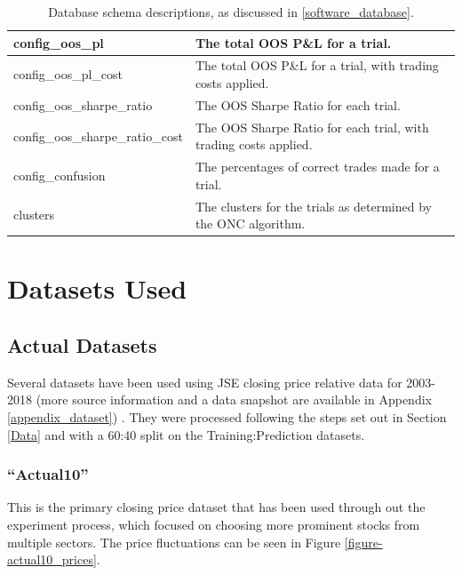 \documentclass[a4paper,11pt,oneside]{article}
\theoremstyle{plain}
\theoremstyle{definition}
\begin{document}
\begin{table}[H]
\begin{tabular}{|p{0.33\linewidth}|p{0.67\linewidth}|}
			{config\_oos\_pl} & {The total OOS P\&L for a trial.}  \\\hline
			{config\_oos\_pl\_cost} & {The total OOS P\&L for a trial, with trading costs applied.}  \\\hline
			{config\_oos\_sharpe\_ratio} & {The OOS Sharpe Ratio for each trial.}  \\\hline
			{config\_oos\_sharpe\_ratio\_cost} & {The OOS Sharpe Ratio for each trial, with trading costs applied.}  \\\hline			
			{config\_confusion} & {The percentages of correct trades made for a trial.}  \\\hline
			{clusters} & {The clusters for the trials as determined by the ONC algorithm.}  \\\hline
		\end{tabular}
		\newline\newline
		\caption{Database schema descriptions, as discussed in \ref{software_database}.}\label{tab_schemas}
	\end{table}
	
	\newpage
	\section{Datasets Used}\label{Datasets}
	
	\subsection{Actual Datasets}
	
	Several datasets have been used using JSE closing price relative data for 2003-2018 (more source information and a data snapshot are available in Appendix \ref{appendix_dataset}) \citep{JSEData}. They were processed following the steps set out in Section \ref{Data} and with a 60:40 split on the Training:Prediction datasets.
	
	\subsubsection{``Actual10''}\label{dataset_actual10}
	
	This is the primary closing price dataset that has been used through out the experiment process, which focused on choosing more prominent stocks from multiple sectors. The price fluctuations can be seen in Figure \ref{figure-actual10_prices}.
	
\end{document}
